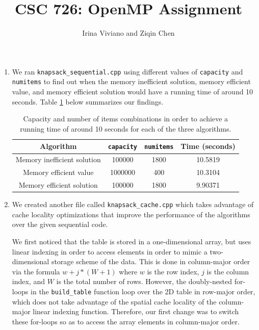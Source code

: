 \documentclass[10pt]{article}
\title{CSC 726: OpenMP Assignment}
\author{Irina Viviano and Ziqin Chen}
\date{}
\begin{document}
\maketitle

\begin{enumerate}

\item We ran \texttt{knapsack\_sequential.cpp} using different values of \texttt{capacity}
 and \texttt{numitems} to find out when the memory inefficient solution, memory efficient value, and memory efficient solution would have a running time of around 10 seconds. Table \ref{tab:10secs} below summarizes our findings.
 
 \begin{table}[h!]
 \begin{center}
 \begin{tabular}{|c|c|c|c|}
 \hline
 Algorithm & \texttt{capacity} & \texttt{numitems} & Time (seconds) \\
 \hline
 Memory inefficient solution & 100000 & 1800 & 10.5819 \\
 Memory efficient value & 1000000 & 400 & 10.3104 \\
 Memory efficient solution & 100000 & 1800 & 9.90371 \\
 \hline
 \end{tabular}
\caption{Capacity and number of items combinations in order to achieve a running time of around 10 seconds for each of the three algorithms.\label{tab:10secs}}
 \end{center}
 \end{table}

\item We created another file called \texttt{knapsack\_cache.cpp} which takes advantage of cache locality optimizations that improve the performance of the algorithms over the given sequential code.

We first noticed that the table is stored in a one-dimensional array, but uses linear indexing in order to access elements in order to mimic a two-dimensional storage scheme of the data. This is done in column-major order via the formula $w+j*(W+1)$ where $w$ is the row index, $j$ is the column index, and $W$ is the total number of rows. However, the doubly-nested for-loops in the \texttt{build\_table} function loop over the 2D table in row-major order, which does not take advantage of the spatial cache locality of the column-major linear indexing function. Therefore, our first change was to switch these for-loops so as to access the array elements in column-major order. 


\end{enumerate}
\end{document}
